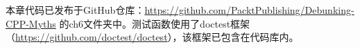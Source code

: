 本章代码已发布于GitHub仓库：\url{https://github.com/PacktPublishing/Debunking-CPP-Myths} 的ch6文件夹中。测试函数使用了doctest框架（\url{https://github.com/doctest/doctest}），该框架已包含在代码库内。